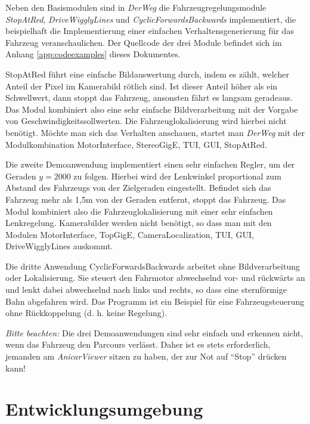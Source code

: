 \documentclass[a4paper, 11pt]{article}
\newcommand{\DerWeg}{\textit{DerWeg }}  %
\newcommand{\AnicarViewer}{\textit{AnicarViewer }}  %
\begin{document}
{Neben den Basismodulen sind in \DerWeg die Fahrzeugregelungsmodule \textit{StopAtRed}, %
\textit{DriveWigglyLines} und \textit{CyclicForwardsBackwards} implementiert, die beispielhaft die Implementierung einer einfachen Verhaltensgenerierung für das Fahrzeug veranschaulichen. Der Quellcode der drei Module befindet sich im Anhang \ref{app:codeexamples} dieses Dokumentes.

StopAtRed führt eine einfache Bildauswertung durch, indem es zählt, welcher Anteil der Pixel im Kamerabild rötlich sind. Ist dieser Anteil höher als ein Schwellwert, dann stoppt das Fahrzeug, ansonsten fährt es langsam geradeaus. Das Modul kombiniert also eine sehr einfache Bildverarbeitung mit der Vorgabe von Geschwindigkeitssollwerten. Die Fahrzeuglokalisierung wird hierbei nicht benötigt. Möchte man sich das Verhalten anschauen, startet man \DerWeg mit der Modulkombination MotorInterface, StereoGigE, TUI, GUI, StopAtRed.


Die zweite Demoanwendung implementiert einen sehr einfachen Regler, um der Geraden $y=2000$ zu folgen. Hierbei wird der Lenkwinkel proportional zum Abstand des Fahrzeugs von der Zielgeraden eingestellt. Befindet sich das Fahrzeug mehr als 1,5m von der Geraden entfernt, stoppt das Fahrzeug. Das Modul kombiniert also die Fahrzeuglokalisierung mit einer sehr einfachen Lenkregelung. Kamerabilder werden nicht benötigt, so dass man mit den Modulen MotorInterface, TopGigE, CameraLocalization, TUI, GUI, DriveWigglyLines auskommt.

Die dritte Anwendung CyclicForwardsBackwards arbeitet ohne Bildverarbeitung oder Lokalisierung. Sie steuert den Fahrmotor abwechselnd vor- und rückwärts an und lenkt dabei abwechselnd nach links und rechts, so dass eine sternförmige Bahn abgefahren wird. Das Programm ist ein Beispiel für eine Fahrzeugsteuerung ohne Rückkoppelung (d. h. keine Regelung).

\textit{Bitte beachten:} Die drei Demoanwendungen sind sehr einfach und erkennen nicht, wenn das Fahrzeug den Parcours verlässt. Daher ist es stets erforderlich, jemanden am \AnicarViewer sitzen zu haben, der zur Not auf "`Stop"' drücken kann!


\section{Entwicklungsumgebung}

}
\end{document}

